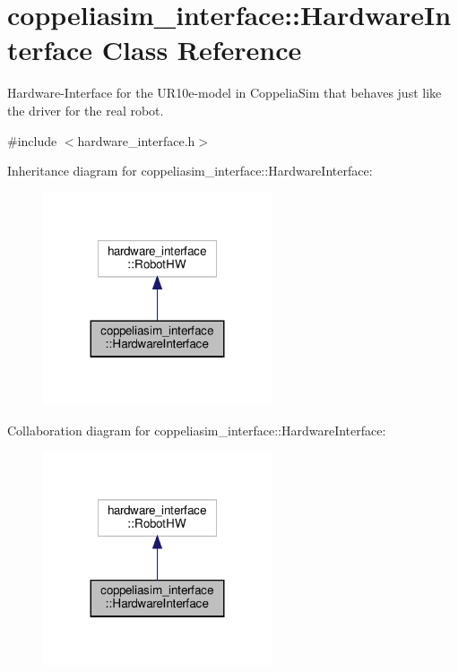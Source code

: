 \hypertarget{classcoppeliasim__interface_1_1HardwareInterface}{}\section{coppeliasim\+\_\+interface\+:\+:Hardware\+Interface Class Reference}
\label{classcoppeliasim__interface_1_1HardwareInterface}


Hardware-\/\+Interface for the U\+R10e-\/model in Coppelia\+Sim that behaves just like the driver for the real robot.  




{\ttfamily \#include $<$hardware\+\_\+interface.\+h$>$}



Inheritance diagram for coppeliasim\+\_\+interface\+:\+:Hardware\+Interface\+:\nopagebreak
\begin{figure}[H]
\begin{center}
\leavevmode
\includegraphics[width=191pt]{classcoppeliasim__interface_1_1HardwareInterface__inherit__graph}
\end{center}
\end{figure}


Collaboration diagram for coppeliasim\+\_\+interface\+:\+:Hardware\+Interface\+:\nopagebreak
\begin{figure}[H]
\begin{center}
\leavevmode
\includegraphics[width=191pt]{classcoppeliasim__interface_1_1HardwareInterface__coll__graph}
\end{center}
\end{figure}
